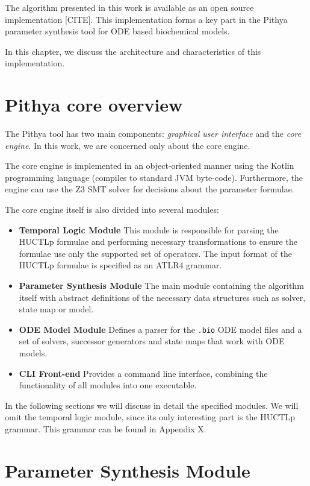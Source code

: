The algorithm presented in this work is available as an open source implementation [CITE]. This implementation forms a key part in the Pithya parameter synthesis tool for ODE based biochemical models.

In this chapter, we discuss the architecture and characteristics of this implementation.

\section{Pithya core overview}

The Pithya tool has two main components: \emph{graphical user interface} and the \emph{core engine}. In this work, we are concerned only about the core engine.

The core engine is implemented in an object-oriented manner using the Kotlin programming language (compiles to standard JVM byte-code). Furthermore, the engine can use the Z3 SMT solver for decisions about the parameter formulae.

The core engine itself is also divided into several modules:

\begin{itemize}
	\item \textbf{Temporal Logic Module} This module is responsible for parsing the \ac{HUCTLp} formulae and performing necessary transformations to ensure the formulae use only the supported set of operators. The input format of the \ac{HUCTLp} formulae is specified as an ATLR4 grammar.
	\item \textbf{Parameter Synthesis Module} The main module containing the algorithm itself with abstract definitions of the necessary data structures such as solver, state map or model.
	\item \textbf{ODE Model Module} Defines a parser for the \texttt{.bio} ODE model files and a set of solvers, successor generators and state maps that work with ODE models.
	\item \textbf{CLI Front-end} Provides a command line interface, combining the functionality of all modules into one executable.
\end{itemize}

In the following sections we will discuss in detail the specified modules. We will omit the temporal logic module, since its only interesting part is the \ac{HUCTLp} grammar. This grammar can be found in Appendix X.

\section{Parameter Synthesis Module}

